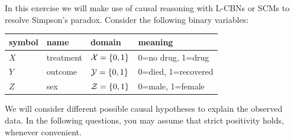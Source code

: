 In this exercise we will make use of causal reasoning with L-CBNs or SCMs to resolve Simpson's paradox.
Consider the following binary variables:
\begin{center}\begin{tabular}{llll}
  symbol & name & domain & meaning \\
  \hline
  $X$ & treatment & $\mathcal{X} = \{0,1\}$ & 0=no drug, 1=drug \\
  $Y$ & outcome   & $\mathcal{Y} = \{0,1\}$ & 0=died, 1=recovered \\
  $Z$ & sex       & $\mathcal{Z} = \{0,1\}$ & 0=male, 1=female
\end{tabular}\end{center}
We will consider different possible causal hypotheses to explain the observed data.
In the following questions, you may assume that strict positivity holds, whenever convenient.
